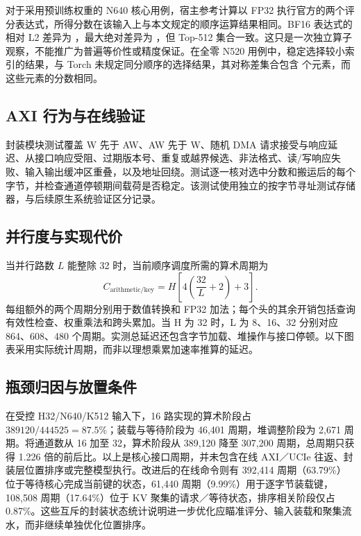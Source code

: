 

对于采用预训练权重的 N640 核心用例，宿主参考计算以 FP32 执行官方的两个评分表达式，所得分数在该输入上与本文规定的顺序运算结果相同。BF16 表达式的相对 L2 差异为 \BfRelative{}，最大绝对差异为 \BfAbsolute{}，但 Top-512 集合一致。这只是一次独立算子观察，不能推广为普遍等价性或精度保证。在全零 N520 用例中，稳定选择较小索引的结果，与 Torch 未规定同分顺序的选择结果，其对称差集合包含 \TieDifference{} 个元素，而这些元素的分数相同。

\subsection{AXI 行为与在线验证}
封装模块测试覆盖 W 先于 AW、AW 先于 W、随机 DMA 请求接受与响应延迟、从接口响应受阻、过期版本号、重复或越界候选、非法格式、读/写响应失败、输入输出缓冲区重叠，以及地址回绕。测试逐一核对选中分数和搬运后的每个字节，并检查通道停顿期间载荷是否稳定。该测试使用独立的按字节寻址测试存储器，与后续原生系统验证区分记录。



\subsection{并行度与实现代价}
当并行路数 $L$ 能整除 32 时，当前顺序调度所需的算术周期为
\begin{equation}
 C_{\mathrm{arithmetic/key}}=H\left[4\left(\frac{32}{L}+2\right)+3\right].
\end{equation}
每组额外的两个周期分别用于数值转换和 FP32 加法；每个头的其余开销包括查询有效性检查、权重乘法和跨头累加。当 H 为 32 时，L 为 8、16、32 分别对应 864、608、480 个周期。实测总延迟还包含字节加载、堆操作与接口停顿。以下图表采用实际统计周期，而非以理想乘累加速率推算的延迟。


\subsection{瓶颈归因与放置条件}
在受控 H32/N640/K512 输入下，16 路实现的算术阶段占 $389120/444525=87.5\%$；装载与等待阶段为 46,401 周期，堆调整阶段为 2,671 周期。将通道数从 16 加至 32，算术阶段从 389,120 降至 307,200 周期，总周期只获得 1.226 倍的前后比。以上是核心接口周期，并未包含在线 AXI／UCIe 往返、封装层位置排序或完整模型执行。改进后的在线命令则有 392,414 周期（63.79\%）位于等待核心完成当前键的状态，61,440 周期（9.99\%）用于逐字节装载键，108,508 周期（17.64\%）位于 KV 聚集的请求／等待状态，排序相关阶段仅占 0.87\%。这些互斥的封装状态统计说明进一步优化应瞄准评分、输入装载和聚集流水，而非继续单独优化位置排序。

